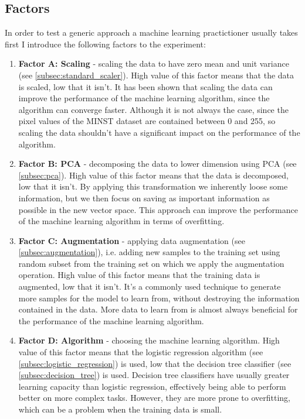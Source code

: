 \documentclass{article}
\begin{document}
\subsection{Factors}
In order to test a generic approach a machine learning practictioner usually takes first I introduce the following factors to the experiment:
\begin{enumerate}
    \item \textbf{Factor A: Scaling} - scaling the data to have zero mean and unit variance (see \ref{subsec:standard_scaler}). High value of this factor means that the data is scaled, low that it isn't. It has been shown that scaling the data can improve the performance of the machine learning algorithm, since the algorithm can converge faster. Although it is not always the case, since the pixel values of the MINST dataset are contained between 0 and 255, so scaling the data shouldn't have a significant impact on the performance of the algorithm.
    \item \textbf{Factor B: PCA} - decomposing the data to lower dimension using PCA (see \ref{subsec:pca}). High value of this factor means that the data is decomposed, low that it isn't. By applying this transformation we inherently loose some information, but we then focus on saving as important information as possible in the new vector space. This approach can improve the performance of the machine learning algorithm in terms of overfitting.
    \item \textbf{Factor C: Augmentation} - applying data augmentation (see \ref{subsec:augmentation}), i.e. adding new samples to the training set using random subset from the training set on which we apply the augmentation operation. High value of this factor means that the training data is augmented, low that it isn't. It's a commonly used technique to generate more samples for the model to learn from, without destroying the information contained in the data. More data to learn from is almost always beneficial for the performance of the machine learning algorithm.
    \item \textbf{Factor D: Algorithm} - choosing the machine learning algorithm. High value of this factor means that the logistic regression algorithm (see \ref{subsec:logistic_regression}) is used, low that the decision tree classifier (see \ref{subsec:decision_tree}) is used. Decision tree classifiers have usually greater learning capacity than logistic regression, effectively being able to perform better on more complex tasks. However, they are more prone to overfitting, which can be a problem when the training data is small.
\end{enumerate}
\end{document}

